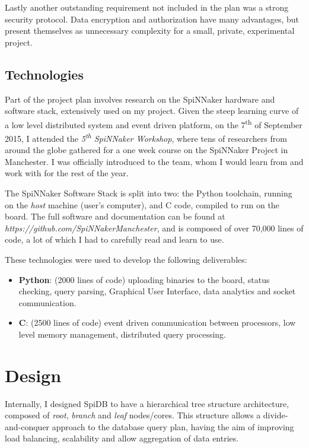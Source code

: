 Lastly another outstanding requirement not included in the plan was a strong security protocol. Data encryption and authorization have many advantages, but present themselves as unnecessary complexity for a small, private, experimental project.

\subsection{Technologies}
Part of the project plan involves research on the SpiNNaker hardware and software stack, extensively used on my project. Given the steep learning curve of a low level distributed system and event driven platform, on the 7\textsuperscript{th} of September 2015, I attended the \textit{5\textsuperscript{th} SpiNNaker Workshop}, where tens of researchers from around the globe gathered for a one week course on the SpiNNaker Project in Manchester. I was officially introduced to the team, whom I would learn from and work with for the rest of the year.

The SpiNNaker Software Stack is split into two: the Python toolchain, running on the \textit{host} machine (user's computer), and C code, compiled to run on the board. The full software and documentation can be found at \textit{https://github.com/SpiNNakerManchester}, and is composed of over 70,000 lines of code, a lot of which I had to carefully read and learn to use.

These technologies were used to develop the following deliverables:
\begin{itemize}
	\item \textbf{Python}: (2000 lines of code) uploading binaries to the board, status checking, query parsing, Graphical User Interface, data analytics and socket communication.
	\item \textbf{C}: (2500 lines of code) event driven communication between processors, low level memory management, distributed query processing.
\end{itemize}

\section{Design}
Internally, I designed SpiDB to have a hierarchical tree structure architecture, composed of \textit{root}, \textit{branch} and \textit{leaf} nodes/cores. This structure allows a divide-and-conquer approach to the database query plan, having the aim of improving load balancing, scalability and allow aggregation of data entries.

